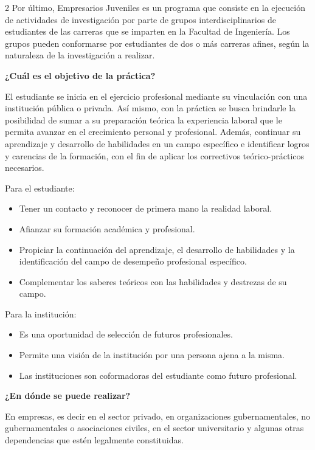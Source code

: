 \documentclass[12pt,spanish,Letterpaper,openany]{book}
\providecommand{\tightlist}{%
  \setlength{\itemsep}{0pt}\setlength{\parskip}{0pt}}
\begin{document}
\begin {multicols}{2}
Por último, Empresarios Juveniles es un programa que consiste en la ejecución de actividades de investigación por parte de grupos interdisciplinarios de estudiantes de las carreras que se imparten en la Facultad de Ingeniería. Los grupos pueden conformarse por estudiantes de dos o más carreras afines, según la naturaleza de la investigación a realizar.

\newpage

\textbf{¿Cuál es el objetivo de la práctica?}

El estudiante se inicia en el ejercicio profesional mediante su vinculación con una institución pública o privada. Así mismo, con la práctica se busca brindarle la posibilidad de sumar a su preparación teórica la experiencia laboral que le permita avanzar en el crecimiento personal y profesional. Además, continuar su aprendizaje y desarrollo de habilidades en un campo específico e identificar logros y carencias de la formación, con el fin de aplicar los correctivos teórico-prácticos necesarios.

Para el estudiante:

\begin{itemize}
\tightlist
\item
  Tener un contacto y reconocer de primera mano la realidad laboral.
\item
  Afianzar su formación académica y profesional.
\item
  Propiciar la continuación del aprendizaje, el desarrollo de habilidades y la identificación del campo de desempeño profesional específico.
\item
  Complementar los saberes teóricos con las habilidades y destrezas de su campo.
\end{itemize}

Para la institución:

\begin{itemize}
\tightlist
\item
  Es una oportunidad de selección de futuros profesionales.
\item
  Permite una visión de la institución por una persona ajena a la misma.
\item
  Las instituciones son coformadoras del estudiante como futuro profesional.
\end{itemize}

\textbf{¿En dónde se puede realizar?}

En empresas, es decir en el sector privado, en organizaciones gubernamentales, no gubernamentales o asociaciones civiles, en el sector universitario y algunas otras dependencias que estén legalmente constituidas.


\end{multicols}
\end{document}
